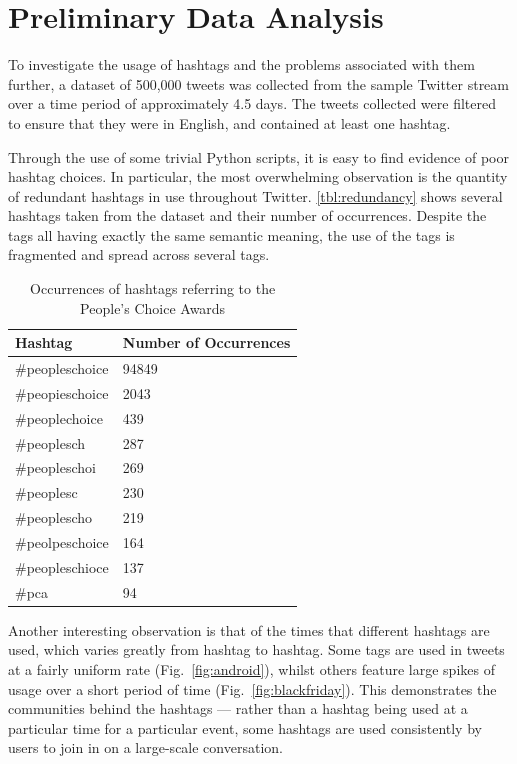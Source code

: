 \documentclass[11pt,a4paper]{report}
\begin{document}
\section{Preliminary Data Analysis}

To investigate the usage of hashtags and the problems associated with them further, a dataset of 500,000 tweets was collected from the sample Twitter stream over a time period of approximately 4.5 days. The tweets collected were filtered to ensure that they were in English, and contained at least one hashtag.

Through the use of some trivial Python scripts, it is easy to find evidence of poor hashtag choices. In particular, the most overwhelming observation is the quantity of redundant hashtags in use throughout Twitter. \autoref{tbl:redundancy} shows several hashtags taken from the dataset and their number of occurrences. Despite the tags all having exactly the same semantic meaning, the use of the tags is fragmented and spread across several tags.

\begin{table}[htpb]
\centering
\begin{tabular}{| l | l |}
    \hline
    \textbf{Hashtag} & \textbf{Number of Occurrences} \\
    \hline \hline
    \#peopleschoice & 94849 \\ \hline
    \#peopieschoice & 2043 \\ \hline
    \#peoplechoice  & 439 \\ \hline
    \#peoplesch     & 287 \\ \hline
    \#peopleschoi   & 269 \\ \hline
    \#peoplesc      & 230 \\ \hline
    \#peoplescho    & 219 \\ \hline
    \#peolpeschoice & 164 \\ \hline
    \#peopleschioce & 137 \\ \hline
    \#pca           & 94 \\ \hline
\end{tabular}
\caption{Occurrences of hashtags referring to the People's Choice Awards}
\label{tbl:redundancy}
\end{table}

Another interesting observation is that of the times that different hashtags are used, which varies greatly from hashtag to hashtag. Some tags are used in tweets at a fairly uniform rate (Fig.~\autoref{fig:android}), whilst others feature large spikes of usage over a short period of time (Fig.~\autoref{fig:blackfriday}). This demonstrates the communities behind the hashtags --- rather than a hashtag being used at a particular time for a particular event, some hashtags are used consistently by users to join in on a large-scale conversation.
\end{document}

